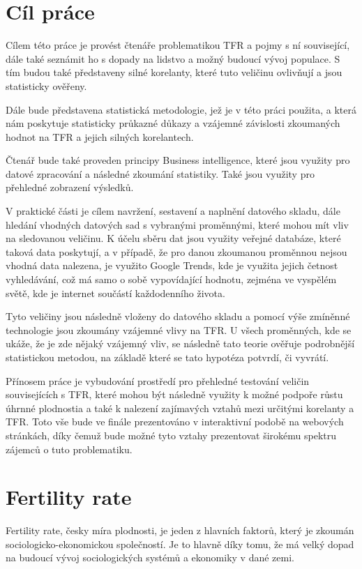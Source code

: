 \documentclass[thesis=M,czech]{FITthesis}[2022/10/08]
\begin{document}
\chapter{Cíl práce}
Cílem této práce je provést čtenáře problematikou TFR a pojmy s ní související, dále také seznámit ho s dopady na lidstvo a možný budoucí vývoj populace. S tím budou také představeny silné korelanty, které tuto veličinu ovlivňují a jsou statisticky ověřeny.

Dále bude představena statistická metodologie, jež je v této práci použita, a která nám poskytuje statisticky průkazné důkazy a vzájemné závislosti zkoumaných hodnot na TFR a jejich silných korelantech.

Čtenář bude také proveden principy Business intelligence, které jsou využity pro datové zpracování a následné zkoumání statistiky. Také jsou využity pro přehledné zobrazení výsledků. 

V praktické části je cílem navržení, sestavení a naplnění datového skladu, dále hledání vhodných datových sad s vybranými proměnnými, které mohou mít vliv na sledovanou veličinu. K účelu sběru dat jsou využity veřejné databáze, které taková data poskytují, a v případě, že pro danou zkoumanou proměnnou nejsou vhodná data nalezena, je využito Google Trends, kde je využita jejich četnost vyhledávání, což má samo o sobě vypovídající hodnotu, zejména ve vyspělém světě, kde je internet součástí každodenního života.

Tyto veličiny jsou následně vloženy do datového skladu a pomocí výše zmíněnné technologie jsou zkoumány vzájemné vlivy na TFR. U všech proměnných, kde se ukáže, že je zde nějaký vzájemný vliv, se následně tato teorie ověřuje podrobnější statistickou metodou, na základě které se tato hypotéza potvrdí, či vyvrátí.

Přínosem práce je vybudování prostředí pro přehledné testování veličin souvisejících s TFR, které mohou být následně využity k možné podpoře růstu úhrnné plodnostia a také k nalezení zajímavých vztahů mezi určitými korelanty a TFR. Toto vše bude ve finále prezentováno v interaktivní podobě na webových stránkách, díky čemuž bude možné tyto vztahy prezentovat širokému spektru zájemců o tuto problematiku.

\chapter{Fertility rate}

Fertility rate, česky míra plodnosti, je jeden z hlavních faktorů, který je zkoumán sociologicko-ekonomickou společností. Je to hlavně díky tomu, že má velký dopad na budoucí vývoj sociologických systémů a ekonomiky v dané zemi. 
\end{document}
